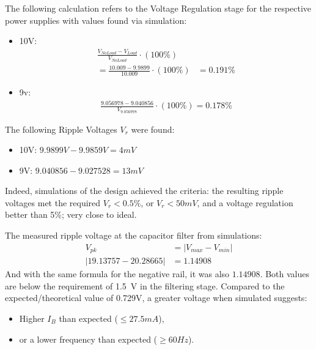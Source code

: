 \documentclass[12pt]{article}
\begin{document}
The following calculation refers to the Voltage Regulation stage for the respective power supplies with values found via simulation:
\begin{itemize}
    \item 10V: \begin{align*}
        \frac{V_{No Load} - V_{Load}}{V_{No Load}} \cdot (100\%)&\\
        = \frac{10.009 - 9.9899}{10.009} \cdot (100\%)& = 0.191\%
    \end{align*}
\end{itemize}
\begin{itemize}
    \item 9v:\begin{align*}
    \frac{9.056978 - 9.040856}{V_{9.056978}} \cdot (100\%) = 0.178\%
    \end{align*}
\end{itemize}

The following Ripple Voltages $V_r$ were found:
\begin{itemize}
    \item 10V: $9.9899V - 9.9859V = 4mV$
    \item 9V: $9.040856 - 9.027528 = 13mV$
\end{itemize}

Indeed, simulations of the design achieved the criteria: the resulting ripple voltages met the required $V_r < 0.5\%$, or $V_r < 50mV$, and a voltage regulation better than 5\%; very close to ideal.

The measured ripple voltage at the capacitor filter from simulations:
\begin{align*}
    V_{pk} &= \left|V_{max} - V_{min}\right|\\
    \left|19.13757 - 20.28665\right| &= 1.14908
\end{align*}
And with the same formula for the negative rail, it was also \(1.14908\). Both values are below the requirement of \SI{1.5}{\volt} in the filtering stage.
Compared to the expected/theoretical value of 0.729V, a greater voltage when simulated suggests:
\begin{itemize}
    \item Higher $I_B$ than expected (\(\leq27.5mA\)),
    \item or a lower frequency than expected (\(\geq60Hz\)).
\end{itemize}
\end{document}
